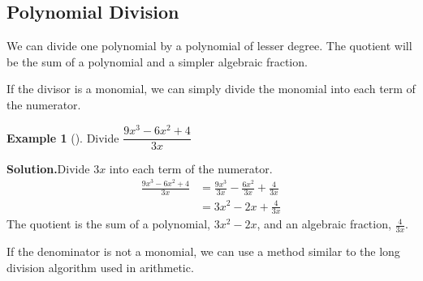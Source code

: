 \documentclass[10pt,]{book}
\theoremstyle{plain}
\theoremstyle{definition}
\theoremstyle{definition}
\newtheorem{example}[theorem]{Example}
\theoremstyle{definition}
\numberwithin{equation}{part}
\newcommand{\amp}{&}
\begin{document}
\subsection[{Polynomial Division}]{Polynomial Division}\label{subsection-32}
We can divide one polynomial by a polynomial of lesser degree. The quotient will be the sum of a polynomial and a simpler algebraic fraction.%
\par
If the divisor is a monomial, we can simply divide the monomial into each term of the numerator.%
\begin{example}[]\label{example-48}
Divide \(\dfrac{9x^3 − 6x^2 + 4}{3x}\)%
\par\medskip\noindent%
\textbf{Solution.}\quad Divide \(3x\) into each term of the numerator.%
\begin{align*}
\frac{9x^3 − 6x^2 + 4}{3x} \amp = \frac{9x^3}{3x}− \frac{6x^2}{3x}+ \frac{4}{3x}
\\
\amp = 3x^2 − 2x + \frac{4}{3x}
\end{align*}
The quotient is the sum of a polynomial, \(3x^2 − 2x\), and an algebraic fraction, \(\frac{4}{3x}\).%
\end{example}
\par
If the denominator is not a monomial, we can use a method similar to the long division algorithm used in arithmetic.%
\end{document}
